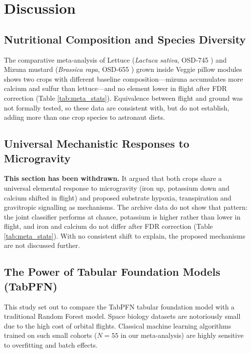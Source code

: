 \chapter{Discussion}
\label{ch:discussion}

\section{Nutritional Composition and Species Diversity}
The comparative meta-analysis of Lettuce (\textit{Lactuca sativa}, OSD-745 \cite{khodadad2020}) and Mizuna mustard (\textit{Brassica rapa}, OSD-655 \cite{bunchek2024}) grown inside Veggie pillow modules shows two crops with different baseline composition---mizuna accumulates more calcium and sulfur than lettuce---and no element lower in flight after FDR correction (Table \ref{tab:meta_stats}). Equivalence between flight and ground was not formally tested, so these data are consistent with, but do not establish, adding more than one crop species to astronaut diets.

\section{Universal Mechanistic Responses to Microgravity}
\textbf{This section has been withdrawn.} It argued that both crops share a
universal elemental response to microgravity (iron up, potassium down and
calcium shifted in flight) and proposed substrate hypoxia, transpiration and
gravitropic signalling as mechanisms. The archive data do not show that
pattern: the joint classifier performs at chance, potassium is higher rather
than lower in flight, and iron and calcium do not differ after FDR correction
(Table \ref{tab:meta_stats}). With no consistent shift to explain, the
proposed mechanisms are not discussed further.

\section{The Power of Tabular Foundation Models (TabPFN)}
This study set out to compare the TabPFN tabular foundation model \cite{hollmann2025} with a traditional Random Forest model. Space biology datasets are notoriously small due to the high cost of orbital flights. Classical machine learning algorithms trained on such small cohorts ($N = 55$ in our meta-analysis) are highly sensitive to overfitting and batch effects. 

